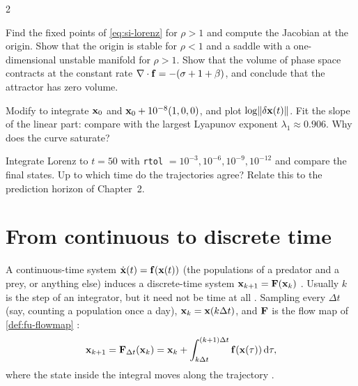 \begin{paracol}{2}
\begin{exercise}
Find the fixed points of \eqref{eq:si-lorenz} for $\rho>1$ and compute the Jacobian at the origin.
Show that the origin is stable for $\rho<1$ and a saddle with a one-dimensional unstable manifold for
$\rho>1$. Show that the volume of phase space contracts at the constant rate
$\nabla\cdot\mathbf{f}=-(\sigma+1+\beta)$, and conclude that the attractor has zero volume.
\end{exercise}

\begin{exercise}
Modify  to integrate $\mathbf{x}_0$ and $\mathbf{x}_0+10^{-8}(1,0,0)$, and plot
$\log\lVert\delta\mathbf{x}(t)\rVert$. Fit the slope of the linear part: compare with the largest Lyapunov
exponent $\lambda_1\approx0.906$. Why does the curve saturate?
\end{exercise}

\begin{exercise}
Integrate Lorenz to $t=50$ with \texttt{rtol} $=10^{-3},10^{-6},10^{-9},10^{-12}$ and compare the final
states. Up to which time do the trajectories agree? Relate this to the prediction horizon of
Chapter~2.
\end{exercise}

\section{From continuous to discrete time}\label{sec:si-discrete}

A continuous-time system $\dot{\mathbf{x}}(t)=\mathbf{f}(\mathbf{x}(t))$ (the populations of a predator and a prey, or
anything else)  induces a discrete-time system
$\mathbf{x}_{k+1}=\mathbf{F}(\mathbf{x}_k)$ . Usually $k$ is the step of an integrator, but it need not
be time at all . Sampling every $\Delta t$ (say, counting a population once a day),
$\mathbf{x}_k=\mathbf{x}(k\Delta t)$, and $\mathbf{F}$ is the flow map of \cref{def:fu-flowmap}
:
\begin{equation}\label{eq:si-flowmap}
  \mathbf{x}_{k+1}=\mathbf{F}_{\Delta t}(\mathbf{x}_k)=\mathbf{x}_k+\int_{k\Delta t}^{(k+1)\Delta t}\mathbf{f}(\mathbf{x}(\tau))\,\mathrm d\tau ,
\end{equation}
where the state inside the integral moves along the trajectory .


\end{paracol}
